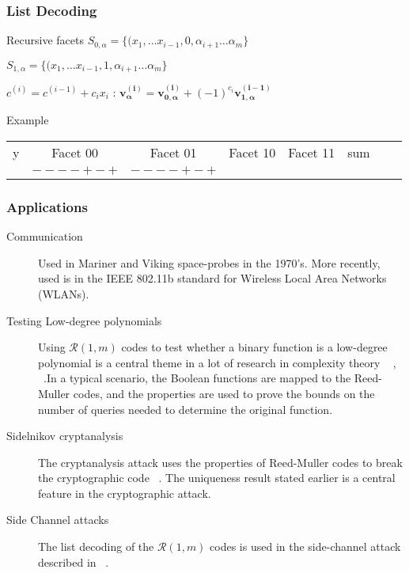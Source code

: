 \documentclass[xcolor=xvgnames]{beamer}
\newcommand{\RM}[2]{\ensuremath{\mathcal{R}(#1,#2)}}
\newcommand{\rem}{Reed-Muller}
\newcommand{\V}[1]{\ensuremath{\mathbf{#1}}}
\begin{document}
\begin{frame}
  \frametitle{List Decoding}
\begin{block}{Recursive facets}
$S_{0,\alpha} =  \{(x_1,\ldots x_{i-1},0, \alpha_{i+1}\ldots \alpha_{m} \} $

$ S_{1,\alpha} =  \{(x_1,\ldots x_{i-1},1, \alpha_{i+1}\ldots \alpha_{m} \} $
 \end{block}

$c^{(i)} = c^{(i-1)}+ c_ix_i$ :
$  \V{v_\alpha^{(i)}} = \V{v_{0,\alpha}^{(i)}} + (-1)^{c_i}\V{v_{1,\alpha}^{(i-1)}} $


  \begin{block}{Example}
\begin{tabular}{|c|c|c|c|c|c|c|c|}
y & Facet 00 & Facet 01 & Facet 10 & Facet 11 & sum \\
 & $----+-+$ & $----+-+$
\hline 
\end{tabular}

\end{block}

\end{frame}


\begin{frame}
  \frametitle{Applications}
  \begin{description}

\item[Communication]
Used in Mariner and Viking space-probes in the 1970's.
More recently, used is in the IEEE 802.11b standard for Wireless Local Area Networks (WLANs).

\item[Testing Low-degree polynomials]
Using $\RM{1}{m}$ codes to test whether a binary function is a low-degree polynomial is a central theme in a lot of research in complexity theory ~\cite{lowdeg} , ~\cite{local+testing}.In a typical scenario, the Boolean functions are mapped to the \rem{} codes, and the properties are used to prove the bounds on the number of queries needed to determine the original function.

\item[Sidelnikov cryptanalysis]
The cryptanalysis attack uses the properties of \rem{} codes to break the cryptographic code ~\cite{attack}. The uniqueness result stated earlier is a central feature in the cryptographic attack.~\cite{correlation}

\item[Side Channel attacks]
The list decoding of the $\RM{1}{m}$ codes is used in the side-channel attack described in ~\cite{roche}.

  \end{description}

\end{frame}
\end{document}
